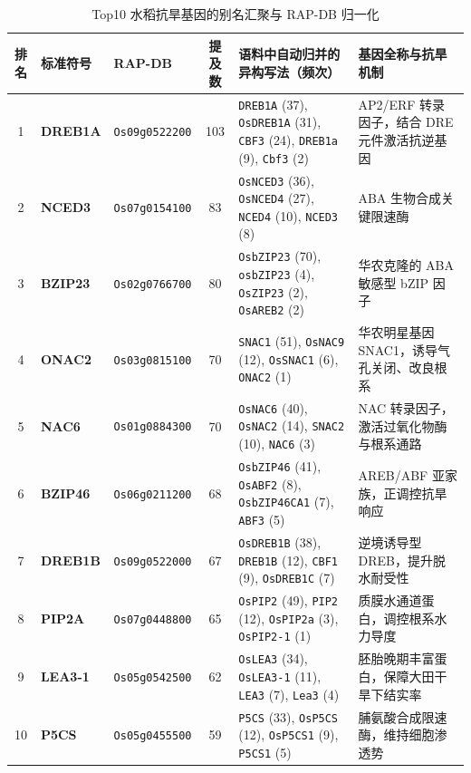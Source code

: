 \documentclass[conference]{IEEEtran}
\begin{document}
\begin{table}[t]
  \centering
  \fontsize{6.9pt}{7.9pt}\selectfont
  \renewcommand{\arraystretch}{0.76}
  \setlength{\tabcolsep}{3.2pt}
  \caption{Top10 水稻抗旱基因的别名汇聚与 RAP-DB 归一化}
  \label{tab:top_genes}
  \begin{tabularx}{\textwidth}{c l l c p{6.4cm} X}
    \toprule
    排名 & 标准符号 & RAP-DB & 提及数 & 语料中自动归并的异构写法（频次） & 基因全称与抗旱机制 \\
    \midrule
    1 & \textbf{DREB1A} & \texttt{Os09g0522200} & 103 & \texttt{DREB1A} (37), \texttt{OsDREB1A} (31), \texttt{CBF3} (24), \texttt{DREB1a} (9), \texttt{Cbf3} (2) & AP2/ERF 转录因子，结合 DRE 元件激活抗逆基因 \\
    2 & \textbf{NCED3} & \texttt{Os07g0154100} & 83 & \texttt{OsNCED3} (36), \texttt{OsNCED4} (27), \texttt{NCED4} (10), \texttt{NCED3} (8) & ABA 生物合成关键限速酶 \\
    3 & \textbf{BZIP23} & \texttt{Os02g0766700} & 80 & \texttt{OsbZIP23} (70), \texttt{osbZIP23} (4), \texttt{OsZIP23} (2), \texttt{OsAREB2} (2) & 华农克隆的 ABA 敏感型 bZIP 因子 \\
    4 & \textbf{ONAC2} & \texttt{Os03g0815100} & 70 & \texttt{SNAC1} (51), \texttt{OsNAC9} (12), \texttt{OsSNAC1} (6), \texttt{ONAC2} (1) & 华农明星基因 SNAC1，诱导气孔关闭、改良根系 \\
    5 & \textbf{NAC6} & \texttt{Os01g0884300} & 70 & \texttt{OsNAC6} (40), \texttt{OsNAC2} (14), \texttt{SNAC2} (10), \texttt{NAC6} (3) & NAC 转录因子，激活过氧化物酶与根系通路 \\
    6 & \textbf{BZIP46} & \texttt{Os06g0211200} & 68 & \texttt{OsbZIP46} (41), \texttt{OsABF2} (8), \texttt{OsbZIP46CA1} (7), \texttt{ABF3} (5) & AREB/ABF 亚家族，正调控抗旱响应 \\
    7 & \textbf{DREB1B} & \texttt{Os09g0522000} & 67 & \texttt{OsDREB1B} (38), \texttt{DREB1B} (12), \texttt{CBF1} (9), \texttt{OsDREB1C} (7) & 逆境诱导型 DREB，提升脱水耐受性 \\
    8 & \textbf{PIP2A} & \texttt{Os07g0448800} & 65 & \texttt{OsPIP2} (49), \texttt{PIP2} (12), \texttt{OsPIP2a} (3), \texttt{OsPIP2-1} (1) & 质膜水通道蛋白，调控根系水力导度 \\
    9 & \textbf{LEA3-1} & \texttt{Os05g0542500} & 62 & \texttt{OsLEA3} (34), \texttt{OsLEA3-1} (11), \texttt{LEA3} (7), \texttt{Lea3} (4) & 胚胎晚期丰富蛋白，保障大田干旱下结实率 \\
    10 & \textbf{P5CS} & \texttt{Os05g0455500} & 59 & \texttt{P5CS} (33), \texttt{OsP5CS} (12), \texttt{OsP5CS1} (9), \texttt{P5CS1} (5) & 脯氨酸合成限速酶，维持细胞渗透势 \\
    \bottomrule
  \end{tabularx}
\end{table}
\end{document}
